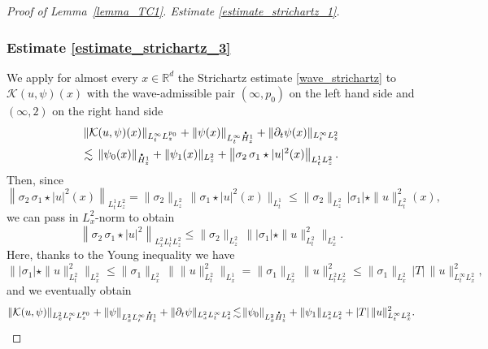 \documentclass[10pt]{amsart}
\theoremstyle{definition}
\newcommand*{\overbigdot}[1]{%
\accentset{\mbox{\large\bfseries .}}{#1}}
\newenvironment{ProofOf}[1]{\begin{proof}[Proof of #1]}{\end{proof}}
\newcommand{\R}{\mathbb{R}}
\begin{document}
\begin{ProofOf}{Lemma~\ref{lemma_TC1}. Estimate \eqref{estimate_strichartz_1}}
\subsubsection*{Estimate \eqref{estimate_strichartz_3}} We apply for almost every $x\in\R^{d}$ the Strichartz estimate \eqref{wave_strichartz} to $\mathcal{K}(u,\psi)(x)$ with the wave-admissible pair $(\infty,p_{0})$ on the left hand side and $(\infty,2)$ on the right hand side\vspace*{-3pt}
\begin{multline*}
\|\mathcal{K}(u,\psi)(x)\|_{L_{t}^{\infty}L_{z}^{p_{0}}}+\|\psi(x)\|_{L_{t}^{\infty}\overbigdot{H}_{z}^{1}}+\|\partial_{t}\psi(x)\|_{L_{t}^{\infty}L_{z}^{2}}\\
\lesssim\,\|\psi_{0}(x)\|_{\overbigdot{H}_{z}^{1}}+\|\psi_{1}(x)\|_{L_{z}^{2}}+\left\|\sigma_{2}\,\sigma_{1}\star|u|^{2}(x)\right\|_{L_{t}^{1}L_{z}^{2}}.
\end{multline*}
Then, since\vspace*{-3pt}
\[
\left\|\sigma_{2}\,\sigma_{1}\star|u|^{2}(x)\right\|_{L_{t}^{1}L_{z}^{2}}=\|\sigma_{2}\|_{L_{z}^{2}}\,\|\sigma_{1}\star|u|^{2}(x)\|_{L_{t}^{1}}\leq\|\sigma_{2}\|_{L_{z}^{2}}\,|\sigma_{1}|\star\|u\|_{L_{t}^{2}}^{2}(x),
\]
we can pass in $L_{x}^{2}$-norm to obtain\vspace*{-3pt}
\[
\left\|\sigma_{2}\,\sigma_{1}\star|u|^{2}\right\|_{L_{x}^{2}L_{t}^{1}L_{z}^{2}}\leq\|\sigma_{2}\|_{L_{z}^{2}}\,\bigl\||\sigma_{1}|\star\|u\|_{L_{t}^{2}}^{2}\bigr\|_{L_{x}^{2}}.
\]
Here, thanks to the Young inequality we have
\[
\bigl\||\sigma_{1}|\star\|u\|_{L_{t}^{2}}^{2}\bigr\|_{L_{x}^{2}}\leq \|\sigma_{1}\|_{L_{x}^{2}}\,\bigl\|\|u\|_{L_{t}^{2}}^{2}\bigr\|_{L_{x}^{1}}=\|\sigma_{1}\|_{L_{x}^{2}}\,\|u\|_{L_{t}^{2}L_{x}^{2}}^{2}\leq \|\sigma_{1}\|_{L_{x}^{2}}\,|T|\,\|u\|_{L_{t}^{\infty}L_{x}^{2}}^{2},
\]
and we eventually obtain\vspace*{-3pt}
\[
\|\mathcal{K}(u,\psi)\|_{L_{x}^{2}L_{t}^{\infty}L_{z}^{p_{0}}}+\|\psi\|_{L_{x}^{2}L_{t}^{\infty}\overbigdot{H}_{z}^{1}}+\|\partial_{t}\psi\|_{L_{x}^{2}L_{t}^{\infty}L_{z}^{2}}\!\lesssim\!\|\psi_{0}\|_{L_{x}^{2}\overbigdot{H}_{z}^{1}}+\|\psi_{1}\|_{L_{x}^{2}L_{z}^{2}}+|T|\,\|u\|_{L_{t}^{\infty}L_{x}^{2}}^{2}.
\]


\end{ProofOf}
\end{document}
